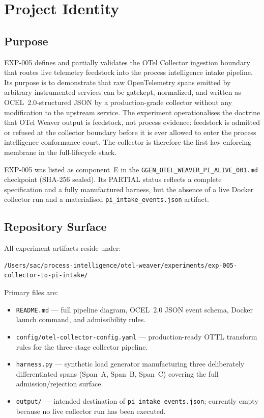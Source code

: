 \section{Project Identity}
\label{sec:otel-weaver-exp-005-collector-to-intake-identity}

\subsection{Purpose}
\label{sec:otel-weaver-exp-005-collector-to-intake-identity-purpose}

EXP-005 defines and partially validates the OTel Collector ingestion boundary that routes live
telemetry feedstock into the process intelligence intake pipeline. Its purpose is to demonstrate
that raw OpenTelemetry spans emitted by arbitrary instrumented services can be gatekept,
normalized, and written as OCEL~2.0-structured JSON by a production-grade collector without
any modification to the upstream service. The experiment operationalises the doctrine that OTel
Weaver output is feedstock, not process evidence: feedstock is admitted or refused at the
collector boundary before it is ever allowed to enter the process intelligence conformance court.
The collector is therefore the first law-enforcing membrane in the full-lifecycle stack.

EXP-005 was listed as component~E in the \texttt{GGEN\_OTEL\_WEAVER\_PI\_ALIVE\_001.md}
checkpoint (SHA-256 sealed). Its PARTIAL status reflects a complete specification and a fully
manufactured harness, but the absence of a live Docker collector run and a materialised
\texttt{pi\_intake\_events.json} artifact.

\subsection{Repository Surface}
\label{sec:otel-weaver-exp-005-collector-to-intake-identity-repository}

All experiment artifacts reside under:
\begin{verbatim}
/Users/sac/process-intelligence/otel-weaver/experiments/exp-005-collector-to-pi-intake/
\end{verbatim}
Primary files are:
\begin{itemize}
  \item \texttt{README.md} --- full pipeline diagram, OCEL~2.0 JSON event schema, Docker launch
        command, and admissibility rules.
  \item \texttt{config/otel-collector-config.yaml} --- production-ready OTTL transform rules
        for the three-stage collector pipeline.
  \item \texttt{harness.py} --- synthetic load generator manufacturing three deliberately
        differentiated spans (Span~A, Span~B, Span~C) covering the full
        admission/rejection surface.
  \item \texttt{output/} --- intended destination of \texttt{pi\_intake\_events.json};
        currently empty because no live collector run has been executed.
\end{itemize}

